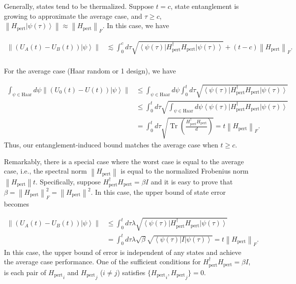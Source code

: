 \documentclass[12pt]{article}
\newcommand{\ket}[1]{\left|#1\right\rangle}
\newcommand{\bra}[1]{\left\langle #1\right|}
\newcommand{\norm}[1]{\left\lVert #1\right\rVert}
\newcommand{\Tr}{\operatorname{Tr}}
\begin{document}
Generally, states tend to be thermalized.
Suppose $t=c$, state entanglement is growing to approximate the average case, and $\tau\ge c$, $\norm{H_{\text{pert}}\ket{\psi(\tau)}}\approx \norm{H_{\text{pert}}}_F$. In this case,
we have

\begin{equation}
\begin{split}
         \norm{(U_A(t)-U_B(t))\ket{\psi}}&\lesssim 
                 \int_0 ^c d\tau \sqrt{\bra{\psi(\tau)} H_{\text{pert}}^\dagger  H_{\text{pert}} \ket{\psi(\tau)}}+(t-c)  \norm{H_{\text{pert}}}_F.\\
\end{split}
\end{equation}


For the average case (Haar random or 1 design), we have

\begin{equation}
    \begin{split}
           \int_{\psi\in \text{Haar}} d\psi \norm{ (U_0(t)-U(t))\ket{\psi}} &\le  \int_{\psi\in \text{Haar}} d\psi\int_0 ^t d\tau \sqrt{\bra{\psi(\tau)} H_{\text{pert}}^\dagger  H_{\text{pert}} \ket{\psi(\tau)}}\\
          &\le  \int_0 ^t d\tau \sqrt{\int_{\psi\in \text{Haar}} d\psi\bra{\psi(\tau)} H_{\text{pert}}^\dagger  H_{\text{pert}} \ket{\psi(\tau)}}\\
          &= \int_0 ^t d\tau \sqrt{\Tr(\frac{H_{\text{pert}}^\dagger H_{\text{pert}}}{d})}=  t \norm{H_{\text{pert}}}_F.
    \end{split}
\end{equation}
 Thus, our entanglement-induced bound matches the average case when $t\ge c$.







Remarkably, there is a special case where the worst case is equal to the average case, i.e., the spectral norm $\norm{H_{\text{pert}}}$ is equal to the normalized Frobenius norm $\norm{H_{\text{pert}}}t$. Specifically, suppose $H_{\text{pert}}^\dagger H_{\text{pert}}= \beta I$ and it is easy to prove that $\beta=\norm{H_{\text{pert}}}^2_F=\norm{H_{\text{pert}}}^2$. In this case, the upper bound of state error becomes


\begin{equation}
\begin{split}
         \norm{(U_A(t)-U_B(t))\ket{\psi}}&\le \int_0 ^t d\tau \lambda \sqrt{\bra{\psi(\tau)} H_{\text{pert}}^\dagger  H_{\text{pert}} \ket{\psi(\tau)}}\\
         &= \int_0 ^t d\tau \lambda  \sqrt{\beta}\sqrt{\bra{\psi(\tau)}I\ket{\psi(\tau)}}=  t \norm{H_{\text{pert}}}_F .
\end{split}
\end{equation}
In this case, the upper bound of error is independent of any states and achieve the average case performance.
One of the sufficient conditions for $ H_{\text{pert}}^\dagger H_{\text{pert}}=\beta I$, is  each pair of ${H_{\text{pert}}}_i$ and ${H_{\text{pert}}}_j$ ($i\ne j$) satisfies $\{ {H_{\text{pert}}}_i,{H_{\text{pert}}}_j\}=0$.\\ 
\end{document}
